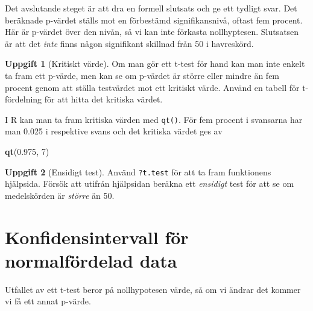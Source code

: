 \documentclass[
]{book}
\newenvironment{Shaded}{\begin{snugshade}}{\end{snugshade}}
\newcommand{\AttributeTok}[1]{\textcolor[rgb]{0.13,0.29,0.53}{#1}}
\newcommand{\DecValTok}[1]{\textcolor[rgb]{0.00,0.00,0.81}{#1}}
\newcommand{\FloatTok}[1]{\textcolor[rgb]{0.00,0.00,0.81}{#1}}
\newcommand{\FunctionTok}[1]{\textcolor[rgb]{0.13,0.29,0.53}{\textbf{#1}}}
\newcommand{\NormalTok}[1]{#1}
\newcommand{\SpecialCharTok}[1]{\textcolor[rgb]{0.81,0.36,0.00}{\textbf{#1}}}
\theoremstyle{definition}
\theoremstyle{definition}
\theoremstyle{definition}
\newtheorem{exercise}{Uppgift}[chapter]
\theoremstyle{definition}
\theoremstyle{remark}
\begin{document}
Det avslutande steget är att dra en formell slutsats och ge ett tydligt svar. Det beräknade p-värdet ställs mot en förbestämd signifikansnivå, oftast fem procent. Här är p-värdet över den nivån, så vi kan inte förkasta nollhyptesen. Slutsatsen är att det \emph{inte} finns någon signifikant skillnad från 50 i havreskörd.

\begin{exercise}[Kritiskt värde]

Om man gör ett t-test för hand kan man inte enkelt ta fram ett p-värde, men kan se om p-värdet är större eller mindre än fem procent genom att ställa testvärdet mot ett kritiskt värde. Använd en tabell för t-fördelning för att hitta det kritiska värdet.

I R kan man ta fram kritiska värden med \texttt{qt()}. För fem procent i svansarna har man 0.025 i respektive svans och det kritiska värdet ges av

\begin{Shaded}
\begin{Highlighting}[]
\FunctionTok{qt}\NormalTok{(}\FloatTok{0.975}\NormalTok{, }\DecValTok{7}\NormalTok{)}
\end{Highlighting}
\end{Shaded}

\end{exercise}

\begin{exercise}[Ensidigt test]
Använd \texttt{?t.test} för att ta fram funktionens hjälpsida. Försök att utifrån hjälpsidan beräkna ett \emph{ensidigt} test för att se om medelskörden är \emph{större} än 50.
\end{exercise}

\section{Konfidensintervall för normalfördelad data}\label{konfidensintervall-fuxf6r-normalfuxf6rdelad-data}

Utfallet av ett t-test beror på nollhypotesen värde, så om vi ändrar det kommer vi få ett annat p-värde.

\begin{Shaded}
\end{Shaded}
\end{document}
